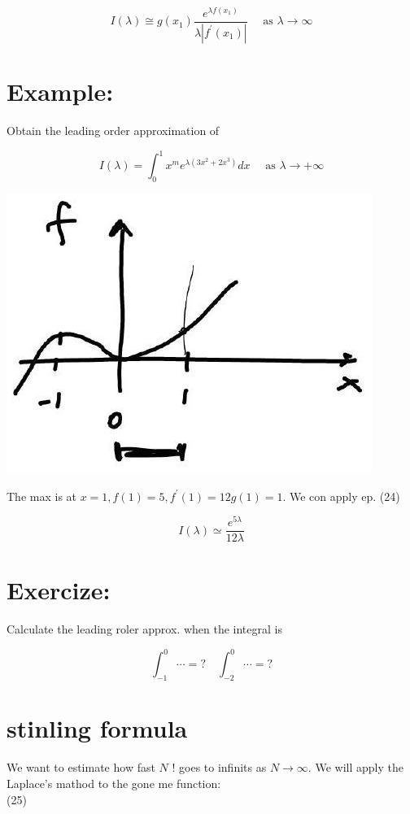 \documentclass[10pt]{article}
\begin{document}
$$
I(\lambda) \cong g\left(x_{1}\right) \frac{e^{\lambda f\left(x_{1}\right)}}{\lambda\left|f^{\prime}\left(x_{1}\right)\right|} \quad \text { as } \lambda \rightarrow \infty
$$

\section*{Example:}
Obtain the leading order approximation of

$$
I(\lambda)=\int_{0}^{1} x^{m} e^{\lambda\left(3 x^{2}+2 x^{3}\right)} d x \quad \text { as } \lambda \rightarrow+\infty
$$

\begin{center}
\includegraphics[max width=\textwidth]{2025_10_19_6d9f59a2c3b97d481c52g-5}
\end{center}

The max is at $x=1, f(1)=5, f^{\prime}(1)=12 g(1)=1$. We con apply ep. (24)

$$
I(\lambda) \simeq \frac{e^{5 \lambda}}{12 \lambda}
$$

\section*{Exercize:}
Calculate the leading roler approx. when the integral is

$$
\int_{-1}^{0} \cdots=? \quad \int_{-2}^{0} \cdots=?
$$

\section*{stinling formula}
We want to estimate how fast $N$ ! goes to infinits as $N \rightarrow \infty$. We will apply the Laplace's mathod to the gone me function:\\
(25)
\end{document}
